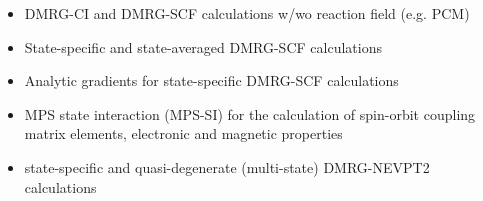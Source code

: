 \documentclass[bibliography=totoc,12pt,a4paper]{scrartcl}
\newcommand{\mol}{\textsc{OpenMolcas}}
\newcommand{\qcm}{\textsc{QCMaquis}}
\begin{document}
\begin{itemize}
	\item DMRG-CI and DMRG-SCF calculations w/wo reaction field (e.g. PCM)
	\item State-specific and state-averaged DMRG-SCF calculations
	\item Analytic gradients for state-specific DMRG-SCF calculations
  \item MPS state interaction (MPS-SI) for the calculation of spin-orbit coupling matrix elements,
  electronic and magnetic properties
  \item state-specific and quasi-degenerate (multi-state) DMRG-NEVPT2 calculations
\end{itemize}

%
%
\end{document}

